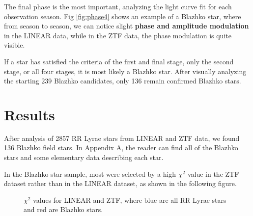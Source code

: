 \documentclass{aa}
\begin{document}
The final phase is the most important, analyzing the light curve fit for each observation season. Fig \ref{fig:phase4} shows an example of a Blazhko star, where from season to season, we can notice slight \textbf{phase and amplitude modulation} in the LINEAR data, while in the ZTF data, the phase modulation is quite visible. 

If a star has satisfied the criteria of the first and final stage, only the second stage, or all four stages, it is most likely a Blazhko star. After visually analyzing the starting 239 Blazhko candidates, only 136 remain confirmed Blazhko stars.

\section{Results}\label{sec:results}
After analysis of 2857 RR Lyrae stars from LINEAR and ZTF data, we found 136 Blazhko field stars. In Appendix A, the reader can find all of the Blazhko stars and some elementary data describing each star. 

In the Blazhko star sample, most were selected by a high $\chi^2$ value in the ZTF dataset rather than in the LINEAR dataset, as shown in the following figure.

\begin{figure}
\caption{$\chi^2$ values for LINEAR and ZTF, where blue are all RR Lyrae stars and red are Blazhko stars.}
\label{fig:chi2}
\end{figure}
\end{document}
